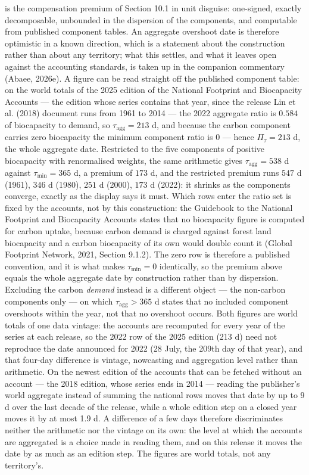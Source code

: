 \documentclass[11pt]{article}
\begin{document}
 is the compensation premium of Section 10.1 in unit disguise: one-signed, exactly decomposable, unbounded in the dispersion of the components, and computable from published component tables. An aggregate overshoot date is therefore optimistic in a known direction, which is a statement about the construction rather than about any territory; what this settles, and what it leaves open against the accounting standards, is taken up in the companion commentary (Abaee, 2026e). A figure can be read straight off the published component table: on the world totals of the 2025 edition of the National Footprint and Biocapacity Accounts --- the edition whose series contains that year, since the release Lin et al. (2018) document runs from 1961 to 2014 --- the 2022 aggregate ratio is \(0.584\) of biocapacity to demand, so \(\tau_{\mathrm{agg}} = 213\) d, and because the carbon component carries zero biocapacity the minimum component ratio is \(0\) --- hence \(\Pi_\tau = 213\) d, the whole aggregate date. Restricted to the five components of positive biocapacity with renormalised weights, the same arithmetic gives \(\tau_{\mathrm{agg}} = 538\) d against \(\tau_{\min} = 365\) d, a premium of \(173\) d, and the restricted premium runs \(547\) d (1961), \(346\) d (1980), \(251\) d (2000), \(173\) d (2022): it shrinks as the components converge, exactly as the display says it must. Which rows enter the ratio set is fixed by the accounts, not by this construction: the Guidebook to the National Footprint and Biocapacity Accounts states that no biocapacity figure is computed for carbon uptake, because carbon demand is charged against forest land biocapacity and a carbon biocapacity of its own would double count it (Global Footprint Network, 2021, Section 9.1.2). The zero row is therefore a published convention, and it is what makes \(\tau_{\min} = 0\) identically, so the premium above equals the whole aggregate date by construction rather than by dispersion. Excluding the carbon \emph{demand} instead is a different object --- the non-carbon components only --- on which \(\tau_{\mathrm{agg}} > 365\) d states that no included component overshoots within the year, not that no overshoot occurs. Both figures are world totals of one data vintage: the accounts are recomputed for every year of the series at each release, so the 2022 row of the 2025 edition (213 d) need not reproduce the date announced for 2022 (28 July, the 209th day of that year), and that four-day difference is vintage, nowcasting and aggregation level rather than arithmetic. On the newest edition of the accounts that can be fetched without an account --- the 2018 edition, whose series ends in 2014 --- reading the publisher's world aggregate instead of summing the national rows moves that date by up to 9 d over the last decade of the release, while a whole edition step on a closed year moves it by at most 1.9 d. A difference of a few days therefore discriminates neither the arithmetic nor the vintage on its own: the level at which the accounts are aggregated is a choice made in reading them, and on this release it moves the date by as much as an edition step. The figures are world totals, not any territory's.
\end{document}
